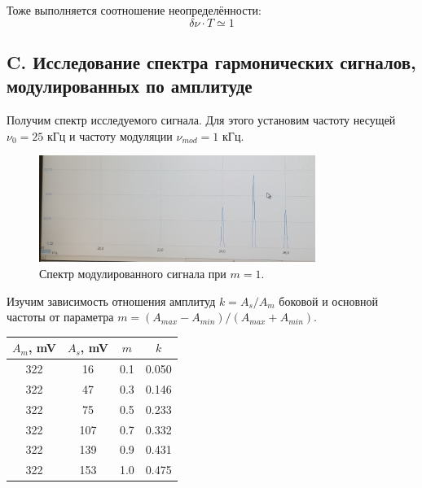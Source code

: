 \documentclass[11pt]{article}
\begin{document}
Тоже выполняется соотношение неопределённости:
\[ \delta\nu\cdot T \simeq 1 \]


\subsection{C. Исследование спектра гармонических сигналов, модулированных по амплитуде}

Получим спектр исследуемого сигнала. Для этого установим частоту несущей \( \nu_0 = 25 \) кГц и частоту модуляции \( \nu_{mod} = 1 \) кГц.


\begin{figure}[H]
    \centering
    \includegraphics[width=0.8\textwidth]{mod_1.jpg}
    \caption{Спектр модулированного сигнала при \( m = 1 \).}
    \label{spec_mod}
\end{figure}

Изучим зависимость отношения амплитуд \( k = A_s/A_m \) боковой и основной частоты от 
параметра \(m = \left(A_{max} - A_{min}\right) / \left(A_{max} + A_{min}\right)\).


\begin{table}[H]
    \centering
    \begin{tabular}{|c|c|c|c|}
        \hline
        \(A_{m}\), mV &  \(A_{s}\), mV & \(m\) & \(k\) \\\hline
        322 & 16  & 0.1 & 0.050 \\\hline
        322 & 47  & 0.3 & 0.146 \\\hline
        322 & 75  & 0.5 & 0.233 \\\hline
        322 & 107 & 0.7 & 0.332 \\\hline
        322 & 139 & 0.9 & 0.431 \\\hline
        322 & 153 & 1.0 & 0.475 \\\hline
        \end{tabular}
\end{table}
\end{document}
